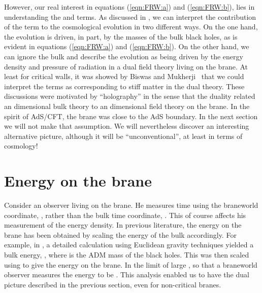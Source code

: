 \documentclass[a4paper,12pt]{article}
\begin{document}
However, our real interest in equations (\ref{eqn:FRW:a}) and
(\ref{eqn:FRW:b}), lies in understanding the \coordHE{} and \coordHE{} terms. As
discussed in \cite{Savonije:braneCFT, Padilla:CFT}, we can interpret
the contribution of the \coordHE{} term to the cosmological evolution in two
different ways. On the one hand, the evolution  is driven, in part, by
the masses of the bulk black holes, as is evident in equations
(\ref{eqn:FRW:a}) and (\ref{eqn:FRW:b}).  On the other hand, we can
ignore the bulk and describe the evolution as  being driven by the
energy density and pressure of radiation in a dual field theory living
on the brane. At least for critical walls, it was showed by Biswas and
Mukherji~\cite{Biswas:stiffmatter} that we could interpret the \coordHE{}
terms as corresponding to stiff matter in the dual theory. These
discussions were motivated by ``holography'' in the sense that the
duality related an \coordHE{} dimensional bulk theory to an \coordHE{}
dimensional field theory on the brane. In the spirit of AdS/CFT, the
brane was close to the AdS boundary. In the next section we will not
make that assumption. We will nevertheless discover an interesting
alternative picture, although it will be ``unconventional'', at least
in terms of cosmology!

\section{Energy on the brane}

Consider an observer living on the brane. He measures time using the
braneworld coordinate, \myHighlight{$\tau$}\coordHE{}, rather than the bulk time coordinate,
\coordHE{}. This of course affects his measurement of the energy density. In
previous literature, the energy on the brane has been obtained by
scaling the energy of the bulk accordingly. For example, in
\cite{Padilla:CFT}, a detailed calculation using Euclidean gravity
techniques yielded a bulk energy, \coordHE{}, where \coordHE{} is the ADM mass of
the black holes. This was then scaled using \coordHE{} to give the
energy on the brane. In the limit of large \coordHE{}, \coordHE{} so that a braneworld observer measures the
energy to be \coordHE{}. This analysis enabled
us to have the dual picture described in the previous section, even
for non-critical branes.
\end{document}
